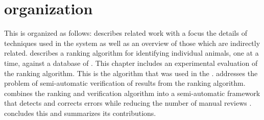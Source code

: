 
\section{\Thesis{} organization} %
    This \thesis{} is organized as follows:
     describes related work with a focus the details of
      techniques used in the system as well as an overview of those which are
      indirectly related.
     describes a ranking algorithm for identifying
      individual animals, one \annot{} at a time, against a database of
      \exemplars{}.
    This chapter includes an experimental evaluation of the ranking algorithm.
    This is the algorithm that was used in the \GZC{}.
     addresses the problem of semi-automatic verification
      of results from the ranking algorithm.
     combines the ranking and verification algorithm into a
      semi-automatic framework that detects and corrects errors while reducing
      the number of manual reviews .
     concludes this \thesis{} and summarizes its contributions.
